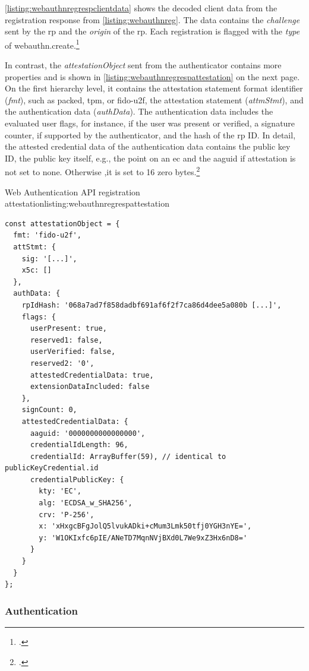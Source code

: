 \autoref{listing:webauthnregrespclientdata} shows the decoded client data from the \wa{} registration response from \autoref{listing:webauthnreg}. The data contains the \textit{challenge} sent by the \gls{rp} and the \textit{origin} of the \gls{rp}. Each registration is flagged with the \textit{type} of \frqq webauthn.create\flqq.\footcites[See][Chapter 5.10.1]{w3c}

In contrast, the \textit{attestationObject} sent from the authenticator contains more properties and is shown in \autoref{listing:webauthnregrespattestation} on the next page. On the first hierarchy level, it contains the attestation statement format identifier (\textit{fmt}), such as \frqq packed, tpm, or fido-u2f\flqq, the attestation statement (\textit{attmStmt}), and the authentication data (\textit{authData}). The authentication data includes the evaluated user flags, for instance, if the user was present or verified, a signature counter, if supported by the authenticator, and the hash of the \gls{rp} ID. In detail, the attested credential data of the authentication data contains the public key ID, the public key itself, e.g., the point on an \gls{ec} and the \gls{aaguid} if attestation is not set to none. Otherwise ,it is set to 16 zero bytes.\footcites[See][Chapter 5.1.3, 6.1]{w3c}

\begin{example}{Web Authentication API registration attestation}{listing:webauthnregrespattestation}
\begin{verbatim}
const attestationObject = {
  fmt: 'fido-u2f',
  attStmt: {
    sig: '[...]',
    x5c: []
  },
  authData: {
    rpIdHash: '068a7ad7f858dadbf691af6f2f7ca86d4dee5a080b [...]',
    flags: {
      userPresent: true,
      reserved1: false,
      userVerified: false,
      reserved2: '0',
      attestedCredentialData: true,
      extensionDataIncluded: false
    },
    signCount: 0,
    attestedCredentialData: {
      aaguid: '0000000000000000',
      credentialIdLength: 96,
      credentialId: ArrayBuffer(59), // identical to publicKeyCredential.id
      credentialPublicKey: {
        kty: 'EC',
        alg: 'ECDSA_w_SHA256',
        crv: 'P-256',
        x: 'xHxgcBFgJolQ5lvukADki+cMum3Lmk50tfj0YGH3nYE=',
        y: 'W1OKIxfc6pIE/ANeTD7MqnNVjBXd0L7We9xZ3Hx6nD8='
      }
    }
  }
};
\end{verbatim}
\end{example}

\subsubsection{Authentication}

